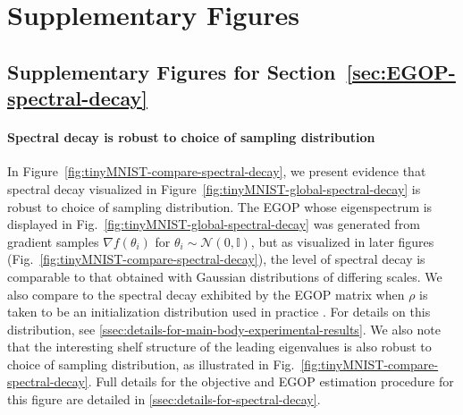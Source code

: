 \section{Supplementary Figures}\label{sec:supplementary-figures}

\subsection{Supplementary Figures for Section~\ref{sec:EGOP-spectral-decay}}\label{ssec:sup-figs-spectral-decay}

\paragraph{Spectral decay is robust to choice of sampling distribution} In Figure~\ref{fig:tinyMNIST-compare-spectral-decay}, we present evidence that spectral decay visualized in Figure~\ref{fig:tinyMNIST-global-spectral-decay} is robust to choice of sampling distribution. The EGOP whose eigenspectrum is displayed in Fig.~\ref{fig:tinyMNIST-global-spectral-decay} was generated from gradient samples $\nabla f(\theta_i)$ for $\theta_i\sim \mathcal{N}(0,\mathbb{I})$, but as visualized in later figures  (Fig.~\ref{fig:tinyMNIST-compare-spectral-decay}), the level of spectral decay is comparable to that obtained with Gaussian distributions of differing scales. We also compare to the spectral decay exhibited by the EGOP matrix when $\rho$ is taken to be an initialization distribution used in practice \cite{glorot2010understanding}. For details on this distribution, see \cref{ssec:details-for-main-body-experimental-results}. We also note that the interesting shelf structure of the leading eigenvalues is also robust to choice of sampling distribution, as illustrated in Fig.~\ref{fig:tinyMNIST-compare-spectral-decay}. Full details for the objective and EGOP estimation procedure for this figure are detailed in \cref{ssec:details-for-spectral-decay}.

